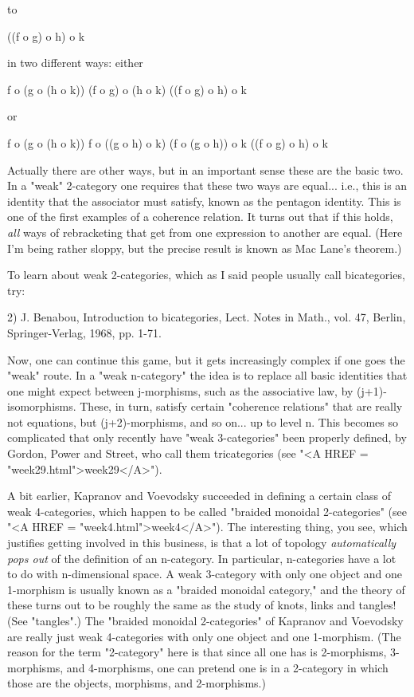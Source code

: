 to 

((f o g) o h) o k

in two different ways: either

f o (g o (h o k)) \to  (f o g) o (h o k) \to  ((f o g) o h) o k

or

f o (g o (h o k)) \to  f o ((g o h) o k) \to  (f o (g o h)) o k \to  ((f o g) o h) o k

Actually there are other ways, but in an important sense these are the
basic two.   In a "weak" 2-category one requires that these two ways are
equal... i.e., this is an identity that the associator must satisfy,
known as the pentagon identity.  This is one of the first examples of a
coherence relation.  It turns out that if this holds, \emph{all} ways of
rebracketing that get from one expression to another are equal.  (Here
I'm being rather sloppy, but the precise result is known as Mac Lane's
theorem.) 

To learn about weak 2-categories, which as I said people usually call
bicategories, try:

2) J. Benabou, Introduction to bicategories, Lect. Notes in Math., vol.
47, Berlin, Springer-Verlag, 1968, pp. 1-71.

Now, one can continue this game, but it gets increasingly complex if one
goes the "weak" route.  In a "weak n-category" the idea is to replace
all basic identities that one might expect between j-morphisms, such as
the associative law, by (j+1)-isomorphisms.  These, in turn, satisfy
certain "coherence relations" that are really not equations, but
(j+2)-morphisms, and so on... up to level n.  This becomes so
complicated that only recently have "weak 3-categories" been properly
defined, by Gordon, Power and Street, who call them tricategories (see
"<A HREF = "week29.html">week29</A>").  

A bit earlier, Kapranov and Voevodsky succeeded in defining a
certain class of weak 4-categories, which happen to be called "braided
monoidal 2-categories" (see "<A HREF = "week4.html">week4</A>").  The
interesting thing, you see, which justifies getting involved in this
business, is that a lot of topology \emph{automatically pops out} of the
definition of an n-category.  In particular, n-categories have a lot
to do with n-dimensional space.  A weak 3-category with only one
object and one 1-morphism is usually known as a "braided monoidal
category," and the theory of these turns out to be roughly the same as
the study of knots, links and tangles!  (See "tangles".)  The "braided
monoidal 2-categories" of Kapranov and Voevodsky are really just weak
4-categories with only one object and one 1-morphism.  (The reason for
the term "2-category" here is that since all one has is 2-morphisms,
3-morphisms, and 4-morphisms, one can pretend one is in a 2-category
in which those are the objects, morphisms, and 2-morphisms.)

